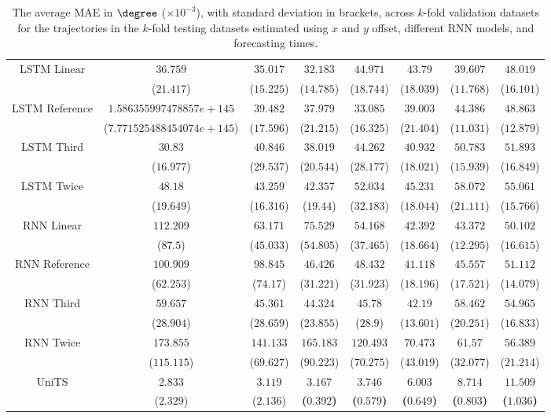 \begin{table}[!ht]
{\begin{tabular}{|c|c|c|c|c|c|c|c|}
			\multirow{2}{*}{LSTM Linear} & $36.759$ & $35.017$ & $32.183$ & $44.971$ & $43.79$ & $39.607$ & $48.019$ \\
			 & ($21.417$) & ($15.225$) & ($14.785$) & ($18.744$) & ($18.039$) & ($11.768$) & ($16.101$) \\ \hline
			\multirow{2}{*}{LSTM Reference} & $1.586355997478857e+145$ & $39.482$ & $37.979$ & $33.085$ & $39.003$ & $44.386$ & $48.863$ \\
			 & ($7.771525488454074e+145$) & ($17.596$) & ($21.215$) & ($16.325$) & ($21.404$) & ($11.031$) & ($12.879$) \\ \hline
			\multirow{2}{*}{LSTM Third} & $30.83$ & $40.846$ & $38.019$ & $44.262$ & $40.932$ & $50.783$ & $51.893$ \\
			 & ($16.977$) & ($29.537$) & ($20.544$) & ($28.177$) & ($18.021$) & ($15.939$) & ($16.849$) \\ \hline
			\multirow{2}{*}{LSTM Twice} & $48.18$ & $43.259$ & $42.357$ & $52.034$ & $45.231$ & $58.072$ & $55.061$ \\
			 & ($19.649$) & ($16.316$) & ($19.44$) & ($32.183$) & ($18.044$) & ($21.111$) & ($15.766$) \\ \hline
			\multirow{2}{*}{RNN Linear} & $112.209$ & $63.171$ & $75.529$ & $54.168$ & $42.392$ & $43.372$ & $50.102$ \\
			 & ($87.5$) & ($45.033$) & ($54.805$) & ($37.465$) & ($18.664$) & ($12.295$) & ($16.615$) \\ \hline
			\multirow{2}{*}{RNN Reference} & $100.909$ & $98.845$ & $46.426$ & $48.432$ & $41.118$ & $45.557$ & $51.112$ \\
			 & ($62.253$) & ($74.17$) & ($31.221$) & ($31.923$) & ($18.196$) & ($17.521$) & ($14.079$) \\ \hline
			\multirow{2}{*}{RNN Third} & $59.657$ & $45.361$ & $44.324$ & $45.78$ & $42.19$ & $58.462$ & $54.965$ \\
			 & ($28.904$) & ($28.659$) & ($23.855$) & ($28.9$) & ($13.601$) & ($20.251$) & ($16.833$) \\ \hline
			\multirow{2}{*}{RNN Twice} & $173.855$ & $141.133$ & $165.183$ & $120.493$ & $70.473$ & $61.57$ & $56.389$ \\
			 & ($115.115$) & ($69.627$) & ($90.223$) & ($70.275$) & ($43.019$) & ($32.077$) & ($21.214$) \\ \hline
			\multirow{2}{*}{UniTS} & $2.833$ & $3.119$ & $\mathbf{3.167}$ & $\mathbf{3.746}$ & $\mathbf{6.003}$ & $\mathbf{8.714}$ & $\mathbf{11.509}$ \\
			 & ($2.329$) & ($2.136$) & \textbf{(}$\mathbf{0.392}$\textbf{)} & \textbf{(}$\mathbf{0.579}$\textbf{)} & \textbf{(}$\mathbf{0.649}$\textbf{)} & \textbf{(}$\mathbf{0.803}$\textbf{)} & \textbf{(}$\mathbf{1.036}$\textbf{)} \\ \hline
		\end{tabular}
	}
	\caption{The average MAE in $\degree$ ($\times 10^{-3}$), with standard deviation in brackets, across $k$-fold validation datasets for the trajectories in the $k$-fold testing datasets estimated using $x$ and $y$ offset, different RNN models, and forecasting times.}
	\label{tab:all_no_abs_MAE}
\end{table}

